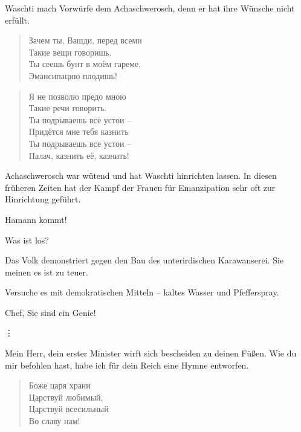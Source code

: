 \documentclass[12pt,a4paper,titlepage]{article}
\begin{document}
\begin{drama}
\uespeaks
Waschti mach Vorwürfe dem Achaschwerosch, denn er hat ihre Wünsche nicht erfüllt.

\ahspeaks {}
\begin{verse}
Зачем ты, Вашди, перед всеми\\
Такие вещи говоришь.\\
Ты сеешь бунт в моём гареме,\\
Эмансипацию плодишь!\\
\end{verse}

\begin{verse}
Я не позволю предо мною\\
Такие речи говорить.\\
Ты подрываешь все устои --\\
Придётся мне тебя казнить\\
Ты подрываешь все устои --\\
 Палач, казнить её, казнить!\\
\end{verse}


\uespeaks
Achaschwerosch war wütend und hat Waschti hinrichten lassen. In diesen früheren Zeiten
hat der Kampf der Frauen für Emanzipation sehr oft zur Hinrichtung geführt.

\scene


\uespeaks
Hamann kommt!

\ahspeaks
Was ist los?

\amspeaks
Das Volk demonstriert gegen den Bau des unterirdischen Karawanserei.
Sie meinen es ist zu teuer.

\ahspeaks
Versuche es mit demokratischen Mitteln -- kaltes Wasser und Pfefferspray.

\amspeaks
Chef, Sie sind ein Genie! 

\vdots

\amspeaks
Mein Herr, dein erster Minister wirft sich bescheiden zu deinen Füßen.
Wie du mir befohlen hast, habe ich für dein Reich eine Hymne entworfen.

\amspeaks {}
\begin{verse}
Боже царя храни\\
Царствуй любимый,\\
Царствуй всесильный\\
Во славу нам!\\
\end{verse}


\end{drama}
\end{document}
